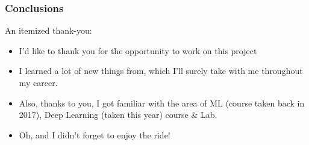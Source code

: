 \begin{frame}
    \frametitle{Conclusions}
    An itemized thank-you:
    \begin{itemize}
    \item I'd like to thank you for the opportunity to work on this project
    \item I learned a lot of new things from, which I'll surely take with me throughout my career.
    \item Also, thanks to you, I got familiar with the area of ML (course taken back in 2017), Deep Learning (taken this year) course \& Lab.
    \item Oh, and I didn't forget to enjoy the ride!
    \end{itemize}
\end{frame}
